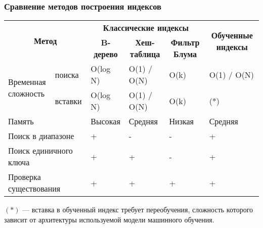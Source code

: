 \documentclass[8pt]{bmstu-pr}
\begin{document}
\begin{frame}
    \fontsize{22pt}{22pt}\selectfont
    \frametitle{Сравнение методов построения индексов}

{
\fontsize{20pt}{20pt}\selectfont
\renewcommand{\arraystretch}{1.5}
\begin{longtable}[Hc]{|p{4cm}|p{1.5cm}|p{3cm}|p{4cm}|p{2.5cm}|p{4cm}|}
    \hline
    \multicolumn{2}{|c|}{\multirow{2}{*}{\textbf{Метод}}} &
    \multicolumn{3}{|c|}{\textbf{Классические индексы}} &
    \multicolumn{1}{c|}{\multirow{2}{*}{\parbox{4cm}{
        \centering\textbf{Обученные индексы}}}}\\
    \cline{3-5}
    \multicolumn{2}{|c|}{} & \multicolumn{1}{c|}{\textbf{B-дерево}} &
    \multicolumn{1}{c|}{\textbf{Хеш-таблица}} &
    \multicolumn{1}{c|}{\parbox{2.5cm}{\centering\textbf{Фильтр Блума}}} & \\
    \hline
    \multirow{2}{*}{\parbox{3cm}{Временная\\сложность}} &
    поиска & O(log N) & O(1) / O(N) & O(k) & O(1) / O(N)\\
    \cline{2-6}
    & вставки & O(log N) & O(1) / O(N) & O(k) & (*)\\
    \hline
    \multicolumn{2}{|l|}{Память} & Высокая & Средняя & Низкая & Средняя\\
    \hline
    \multicolumn{2}{|l|}{Поиск в диапазоне} & + & - & - & + \\
    \hline
    \multicolumn{2}{|l|}{Поиск единичного ключа} & + & + & - & + \\
    \hline
    \multicolumn{2}{|l|}{Проверка существования} & + & + & + & + \\
    \hline
\end{longtable}
}

$(*)$ --- вставка в обученный индекс требует переобучения, сложность которого
зависит от архитектуры используемой модели машинного обучения.
\end{frame}

\end{document}
